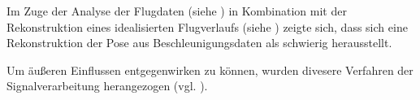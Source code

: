 



Im Zuge der Analyse der Flugdaten (siehe ) in Kombination mit der Rekonstruktion eines idealisierten Flugverlaufs (siehe ) zeigte sich, dass sich eine Rekonstruktion der Pose aus Beschleunigungsdaten als schwierig herausstellt.

Um äußeren Einflussen entgegenwirken zu können, wurden divesere Verfahren der Signalverarbeitung herangezogen (vgl. ). 



